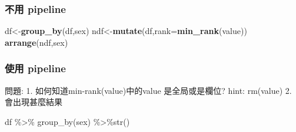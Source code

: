 \documentclass[]{book}
\newenvironment{Shaded}{\begin{snugshade}}{\end{snugshade}}
\newcommand{\DataTypeTok}[1]{\textcolor[rgb]{0.13,0.29,0.53}{#1}}
\newcommand{\KeywordTok}[1]{\textcolor[rgb]{0.13,0.29,0.53}{\textbf{#1}}}
\newcommand{\NormalTok}[1]{#1}
\newcommand{\OperatorTok}[1]{\textcolor[rgb]{0.81,0.36,0.00}{\textbf{#1}}}
\newcommand{\StringTok}[1]{\textcolor[rgb]{0.31,0.60,0.02}{#1}}
\theoremstyle{definition}
\theoremstyle{definition}
\theoremstyle{definition}
\theoremstyle{remark}
\begin{document}
\hypertarget{-pipeline}{%
\subsubsection{不用 pipeline}\label{-pipeline}}

\begin{Shaded}
\begin{Highlighting}[]
\NormalTok{df<-}\KeywordTok{group_by}\NormalTok{(df,sex)}
\NormalTok{ndf<-}\KeywordTok{mutate}\NormalTok{(df,}\DataTypeTok{rank=}\KeywordTok{min_rank}\NormalTok{(value))}
\KeywordTok{arrange}\NormalTok{(ndf,sex)}
\end{Highlighting}
\end{Shaded}

\hypertarget{-pipeline}{%
\subsubsection{使用 pipeline}\label{-pipeline}}

\begin{Shaded}
\end{Shaded}

問題: 1. 如何知道min-rank(value)中的value 是全局或是欄位? hint:
rm(value) 2. 會出現甚麼結果

df \%\textgreater{}\% group\_by(sex) \%\textgreater{}\%str()

\begin{Shaded}
\end{Shaded}

\begin{Shaded}
\end{Shaded}
\end{document}
